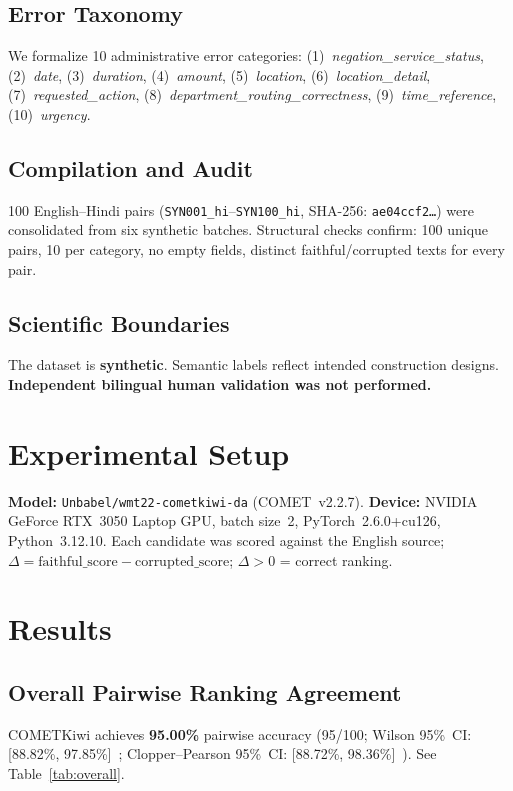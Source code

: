 \documentclass[conference]{IEEEtran}
\begin{document}
\subsection{Error Taxonomy}
We formalize 10 administrative error categories: (1)~\textit{negation\_service\_status},
(2)~\textit{date}, (3)~\textit{duration}, (4)~\textit{amount}, (5)~\textit{location},
(6)~\textit{location\_detail}, (7)~\textit{requested\_action},
(8)~\textit{department\_routing\_correctness}, (9)~\textit{time\_reference},
(10)~\textit{urgency}.

\subsection{Compilation and Audit}
100 English--Hindi pairs (\texttt{SYN001\_hi}--\texttt{SYN100\_hi},
SHA-256: \texttt{ae04ccf2\ldots}) were consolidated from six synthetic batches.
Structural checks confirm: 100 unique pairs, 10 per category, no empty fields,
distinct faithful/corrupted texts for every pair.

\subsection{Scientific Boundaries}
The dataset is \textbf{synthetic}. Semantic labels reflect intended construction
designs. \textbf{Independent bilingual human validation was not performed.}

\section{Experimental Setup}
\textbf{Model:} \texttt{Unbabel/wmt22-cometkiwi-da} (COMET~v2.2.7).
\textbf{Device:} NVIDIA GeForce RTX~3050 Laptop GPU, batch size~2,
PyTorch~2.6.0+cu126, Python~3.12.10.
Each candidate was scored against the English source;
$\Delta = \text{faithful\_score} - \text{corrupted\_score}$;
$\Delta > 0$ = correct ranking.

\section{Results}

\subsection{Overall Pairwise Ranking Agreement}
COMETKiwi achieves \textbf{95.00\%} pairwise accuracy (95/100;
Wilson 95\%~CI: [88.82\%, 97.85\%]~\cite{wilson-1927-probable};
Clopper--Pearson 95\%~CI: [88.72\%, 98.36\%]~\cite{clopper-pearson-1934-use}).
See Table~\ref{tab:overall}.
\end{document}
